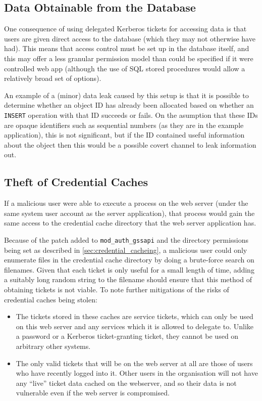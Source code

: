 \documentclass[12pt]{report}
\begin{document}
\subsection{Data Obtainable from the Database}
One consequence of using delegated Kerberos tickets for accessing data is that users are given direct access to the database (which they may not otherwise have had). This means that access control must be set up in the database itself, and this may offer a less granular permission model than could be specified if it were controlled web app (although the use of SQL stored procedures would allow a relatively broad set of options).

An example of a (minor) data leak caused by this setup is that it is possible to determine whether an object ID has already been allocated based on whether an \texttt{INSERT} operation with that ID succeeds or fails. On the asumption that these IDs are opaque identifiers such as sequential numbers (as they are in the example application), this is not significant, but if the ID contained useful information about the object then this would be a possible covert channel to leak information out.

\subsection{Theft of Credential Caches}
\label{sec:theft_of_credential_caches}
If a malicious user were able to execute a process on the web server (under the same system user account as the server application), that process would gain the same access to the credential cache directory that the web server application has.

Because of the patch added to \verb+mod_auth_gssapi+ and the directory permissions being set as described in \autoref{sec:credential_cacheing}, a malicious user could only enumerate files in the credential cache directory by doing a brute-force search on filenames. Given that each ticket is only useful for a small length of time, adding a suitably long random string to the filename should ensure that this method of obtaining tickets is not viable. To note further mitigations of the risks of credential caches being stolen:

\begin{itemize}
\item
  The tickets stored in these caches are service tickets, which can only be used on this web server and any services which it is allowed to delegate to. Unlike a password or a Kerberos ticket-granting ticket, they cannot be used on arbitrary other systems.
\item
  The only valid tickets that will be on the web server at all are those of users who have recently logged into it. Other users in the organisation will not have any ``live'' ticket data cached on the webserver, and so their data is not vulnerable even if the web server is compromised.
\end{itemize}
\end{document}
